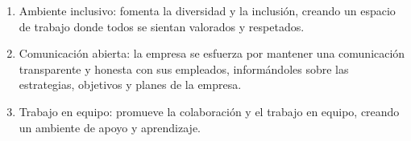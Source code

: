 \documentclass{article}
\begin{document}
\begin{enumerate}
  \item Ambiente inclusivo: fomenta la diversidad y la inclusión, creando un espacio de trabajo donde todos se sientan valorados y respetados. 
  \item Comunicación abierta: la empresa se esfuerza por mantener una comunicación transparente y honesta con sus empleados, informándoles sobre las estrategias, objetivos y planes de la empresa. 
  \item Trabajo en equipo: promueve la colaboración y el trabajo en equipo, creando un ambiente de apoyo y aprendizaje. 
\end{enumerate}



 


 


 



 


 


 


\end{document}
